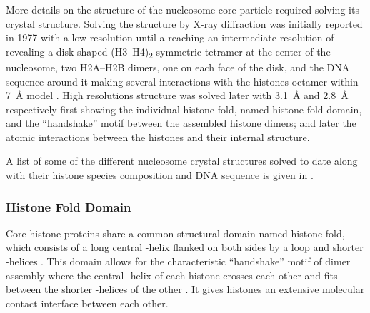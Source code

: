     More details on the structure of the nucleosome core particle required
    solving its crystal structure.  Solving the structure by X-ray
    diffraction was initially reported in 1977
    \citep{finch1977-first-structure}
    with a low resolution until a reaching an
    intermediate resolution of
    revealing a disk shaped (H3--H4)\textsubscript{2} symmetric tetramer
    at the center of the nucleosome, two H2A--H2B dimers,
    one on each face of the disk, and the DNA sequence around it
    making several interactions with the histones octamer within
    \SI{7}{\angstrom} model \citep{richmond1984-7angstrom}.
    High resolutions structure was solved later
    \citep{arents1991-31angstrom,luger1997-28angstrom}
    with \SI{3.1}{\angstrom} and \SI{2.8}{\angstrom}
    respectively
    first showing the individual histone fold, named histone fold domain,
    and the ``handshake'' motif between the assembled histone dimers;
    and later the atomic interactions between the histones and their
    internal structure.

    A list of some of the
    different nucleosome crystal structures solved to date along with their histone species
    composition and DNA sequence is given in .


    \subsubsection{Histone Fold Domain}

      Core histone proteins share a common structural domain named
      histone fold, which consists of a long central
      \textalpha-helix flanked on both sides by a loop
      and shorter \textalpha-helices \citep{arents1991-31angstrom, arents1995histone-fold}.
      This domain allows for the characteristic ``handshake'' motif
      of dimer assembly where the central \textalpha-helix of each
      histone crosses each other and fits between the shorter
      \textalpha-helices of the other .
      It gives histones an extensive molecular contact interface
      between each other.

